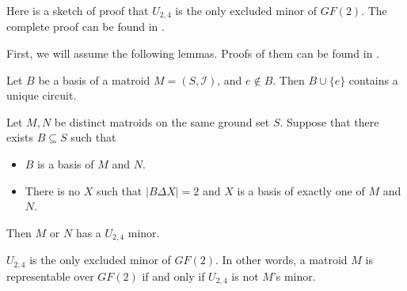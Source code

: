 Here is a sketch of proof that $U_{2, 4}$ is the only excluded minor of $GF(2)$.
The complete proof can be found in \cite{lec9}.

First, we will assume the following lemmas. Proofs of them can be found in \cite{lec9}.

\begin{lem}
Let $B$ be a basis of a matroid $M = (S, \mathcal{I})$, and $e \notin B$.
Then $B \cup \{ e \}$ contains a unique circuit.
\end{lem}

\begin{lem}
Let $M, N$ be distinct matroids on the same ground set $S$.
Suppose that there exists $B \subseteq S$ such that
\begin{itemize}
\item $B$ is a basis of $M$ and $N$.
\item There is no $X$ such that $\lvert B \Delta X \rvert = 2$ and $X$ is a basis of exactly one of $M$ and $N$.
\end{itemize}
Then $M$ or $N$ has a $U_{2, 4}$ minor.
\end{lem}

\begin{thm}
$U_{2, 4}$ is the only excluded minor of $GF(2)$.
In other words, a matroid $M$ is representable over $GF(2)$ if and only if $U_{2, 4}$ is not $M$'s minor.
\end{thm}


